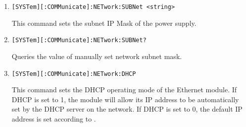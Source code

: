 \documentclass[a4paper,10pt]{article}
\begin{document}
\begin{enumerate}
\begin{enumerate}
		    \begin{description}
		        *
	        \end{description}
	    \item 
	        \begin{verbatim}[SYSTem][:COMMunicate]:NETwork:SUBNet <string>\end{verbatim}
	        \begin{description}
	            This command sets the subnet IP Mask of the power supply.
	        \end{description}
	    \item 
	        \begin{verbatim}[SYSTem][:COMMunicate]:NETwork:SUBNet?\end{verbatim}
	        \begin{description}
		        Queries the value of manually set network subnet mask.
		    \end{description}
		\item 
		    \begin{verbatim}[SYSTem][:COMMunicate]:NETwork:DHCP\end{verbatim}
		    \begin{description}
		        This command sets the DHCP operating mode of the Ethernet module. If DHCP is set to 1, the module will allow its IP address to be automatically set by the DHCP server on the network. If DHCP is set to 0, the default IP address is set according to .

\end{description}
\end{enumerate}
\end{enumerate}
\end{document}
